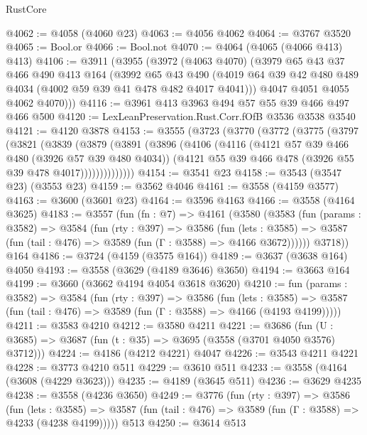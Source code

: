 \begin{lexlean}{RustCore}
\begin{coremodule}
@4062 := @4058 (@4060 @23)
@4063 := @4056 @4062
@4064 := @3767 @3520
@4065 := Bool.or
@4066 := Bool.not
@4070 := @4064 (@4065 (@4066 @413) @413)
@4106 := @3911
    (@3955
      (@3972
        (@4063 @4070)
        (@3979
          @65
          @43
          @37
          @466
          @490
          @413
          @164
          (@3992
            @65
            @43
            @490
            (@4019 @64 @39 @42 @480 @489 @4034 (@4002 @59 @39 @41 @478 @482 @4017 @4041)))
          @4047
          @4051
          @4055
          @4062
          @4070)))
@4116 := @3961 @413 @3963 @494 @57 @55 @39 @466 @497 @466 @500
@4120 := LexLeanPreservation.Rust.Corr.fOfB @3536 @3538 @3540
@4121 := @4120 @3878
@4153 := @3555
    (@3723
      (@3770
        (@3772
          (@3775
            (@3797
              (@3821
                (@3839
                  (@3879
                    (@3891
                      (@3896
                        (@4106
                          (@4116
                            (@4121 @57 @39 @466 @480 (@3926 @57 @39 @480 @4034))
                            (@4121 @55 @39 @466 @478 (@3926 @55 @39 @478 @4017))))))))))))))
@4154 := @3541 @23
@4158 := @3543 (@3547 @23) (@3553 @23)
@4159 := @3562 @4046
@4161 := @3558 (@4159 @3577)
@4163 := @3600 (@3601 @23)
@4164 := @3596 @4163
@4166 := @3558 (@4164 @3625)
@4183 := @3557
    (fun (fn : @7) =>
    @4161
      (@3580
        (@3583
          (fun (params : @3582) =>
          @3584
            (fun (rty : @397) =>
            @3586
              (fun (lets : @3585) =>
              @3587 (fun (tail : @476) => @3589 (fun (Γ : @3588) => @4166 @3672))))))
        @3718))
    @164
@4186 := @3724 (@4159 (@3575 @164))
@4189 := @3637 (@3638 @164) @4050
@4193 := @3558 (@3629 (@4189 @3646) @3650)
@4194 := @3663 @164
@4199 := @3660 (@3662 @4194 @4054 @3618 @3620)
@4210 := fun (params : @3582) =>
  @3584
    (fun (rty : @397) =>
    @3586
      (fun (lets : @3585) =>
      @3587 (fun (tail : @476) => @3589 (fun (Γ : @3588) => @4166 (@4193 @4199)))))
@4211 := @3583 @4210
@4212 := @3580 @4211
@4221 := @3686 (fun (U : @3685) => @3687 (fun (t : @35) => @3695 (@3558 (@3701 @4050 @3576) @3712)))
@4224 := @4186 (@4212 @4221) @4047
@4226 := @3543 @4211 @4221
@4228 := @3773 @4210 @511
@4229 := @3610 @511
@4233 := @3558 (@4164 (@3608 (@4229 @3623)))
@4235 := @4189 (@3645 @511)
@4236 := @3629 @4235
@4238 := @3558 (@4236 @3650)
@4249 := @3776
    (fun (rty : @397) =>
    @3586
      (fun (lets : @3585) =>
      @3587 (fun (tail : @476) => @3589 (fun (Γ : @3588) => @4233 (@4238 @4199)))))
    @513
@4250 := @3614 @513

\end{coremodule}
\end{lexlean}
